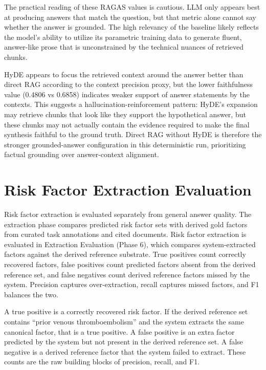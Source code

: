 The practical reading of these RAGAS values is cautious. LLM only appears best at producing answers that match the question, but that metric alone cannot say whether the answer is grounded. The high relevancy of the baseline likely reflects the model's ability to utilize its parametric training data to generate fluent, answer-like prose that is unconstrained by the technical nuances of retrieved chunks.

HyDE appears to focus the retrieved context around the answer better than direct RAG according to the context precision proxy, but the lower faithfulness value (0.4806 vs 0.6858) indicates weaker support of answer statements by the contexts. This suggests a hallucination-reinforcement pattern: HyDE's expansion may retrieve chunks that look like they support the hypothetical answer, but these chunks may not actually contain the evidence required to make the final synthesis faithful to the ground truth. Direct RAG without HyDE is therefore the stronger grounded-answer configuration in this deterministic run, prioritizing factual grounding over answer-context alignment.

\section{Risk Factor Extraction Evaluation}

Risk factor extraction is evaluated separately from general answer quality. The extraction phase compares predicted risk factor sets with derived gold factors from curated task annotations and cited documents. Risk factor extraction is evaluated in Extraction Evaluation (Phase 6), which compares system-extracted factors against the derived reference substrate. True positives count correctly recovered factors, false positives count predicted factors absent from the derived reference set, and false negatives count derived reference factors missed by the system. Precision captures over-extraction, recall captures missed factors, and F1 balances the two.

A true positive is a correctly recovered risk factor. If the derived reference set contains ``prior venous thromboembolism'' and the system extracts the same canonical factor, that is a true positive. A false positive is an extra factor predicted by the system but not present in the derived reference set. A false negative is a derived reference factor that the system failed to extract. These counts are the raw building blocks of precision, recall, and F1.

